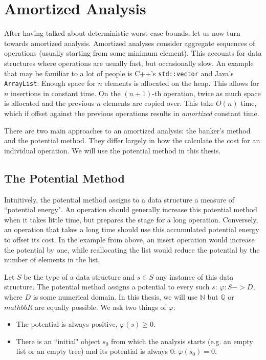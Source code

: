 
\chapter{Amortized Analysis}
After having talked about deterministic worst-case bounds, let us now turn towards amortized analysis. Amortized analyses consider aggregate sequences of operations (usually starting from some minimum element). This accounts for data structures where operations are usually fast, but occasionally slow. An example that may be familiar to a lot of people is C++'s \texttt{std::vector} and Java's \texttt{ArrayList}: Enough space for $n$ elements is allocated on the heap. This allows for $n$ insertions in constant time. On the $(n+1)$-th operation, twice as much space is allocated and the previous $n$ elements are copied over. This take $O(n)$ time, which if offset against the previous operations results in \emph{amortized} constant time.

There are two main approaches to an amortized analysis: the banker's method and the potential method. They differ largely in how the calculate the cost for an individual operation. We will use the potential method in this thesis.

\section{The Potential Method}
Intuitively, the potential method assigns to a data structure a measure of ``potential energy". An operation should generally increase this potential method when it takes little time, but prepares the stage for a long operation. Conversely, an operation that takes a long time should use this accumulated potential energy to offset its cost. In the example from above, an insert operation would increase the potential by one, while reallocating the list would reduce the potential by the number of elements in the list.

Let $S$ be the type of a data structure and $s \in S$ any instance of this data structure. The potential method assigns a potential to every such $s$: $\varphi : S -> D$, where $D$ is some numerical domain. In this thesis, we will use $\mathbb N$ but $\mathbb Q$ or $mathbb R$ are equally possible. We ask two things of $\varphi$:

\begin{itemize}
    \item The potential is always positive, $\varphi(s) \geq 0$.
    \item There is an ``initial" object $s_0$ from which the analysis starts (e.g. an empty list or an empty tree) and its potential is always 0: $\varphi(s_0) = 0$.
\end{itemize}

